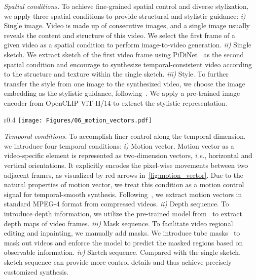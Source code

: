 \emph{Spatial conditions.}
To achieve fine-grained spatial control and diverse stylization, we apply three spatial conditions to provide
structural and stylistic guidance:
\emph{i)} Single image.
Video is made up of consecutive images, and a single image usually reveals the content and structure of this video.
We select the first frame of a given video as a spatial condition to perform image-to-video generation.
\emph{ii)} Single sketch.
We extract sketch of the first video frame using PiDiNet~\cite{su2021pixel_diff} as the second spatial condition and encourage \method to synthesize temporal-consistent video according to the structure and texture within the single sketch.
\emph{iii)} Style.
To further transfer the style from one image to the synthesized video, 
we choose the image embedding as the stylistic guidance,  following~\cite{balaji2022ediffi,huang2023composer}.
We apply a pre-trained image encoder from OpenCLIP ViT-H/14 to extract the stylistic representation.
\begin{wrapfigure}{r}{0.4\linewidth}
    \vspace{-0.2em}
    \texttt{[image: Figures/06\_motion\_vectors.pdf]}
    \caption{\textbf{Examples of motion vectors}.}
    \label{fig:motion_vector}
\end{wrapfigure}
\vspace{-1em}

\emph{Temporal conditions.}
To accomplish finer control along the temporal dimension,  we introduce four temporal conditions:
\emph{i)} Motion vector.
Motion vector as a video-specific element is represented as two-dimension vectors, \emph{i.e.}, horizontal and vertical orientations. 
It explicitly encodes the pixel-wise movements between two adjacent frames, as visualized by red arrows in~\cref{fig:motion_vector}.
Due to the natural properties of motion vector,
we treat this condition as a motion control signal for temporal-smooth synthesis.
Following~\cite{wu2018compressed,shou2019dmc}, we extract motion vectors in standard MPEG-4 format from compressed videos.
\emph{ii)} Depth sequence.
To introduce depth information, we utilize the pre-trained model from~\cite{ranftl2020robust_depth} to extract depth maps of video frames.
\emph{iii)} Mask sequence.
To facilitate video regional editing and inpainting, we manually add masks.
We introduce tube masks~\cite{tong2022videomae,feichtenhofer2022masked_spatiotemporal} to mask out videos and enforce the model to predict the masked regions based on observable information.
\emph{iv)} Sketch sequence.
Compared with the single sketch, sketch sequence can provide more control details and thus achieve precisely customized synthesis.

